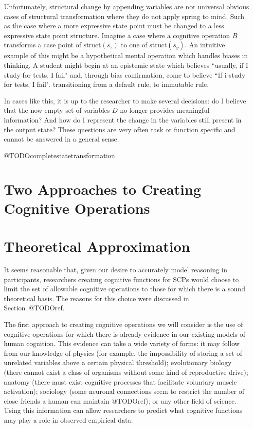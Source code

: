 Unfortunately, structural change by appending variables are not universal obvious cases of structural transformation where they do not apply spring to mind. Such as the case where a more expressive state point must be changed to a less expressive state point structure. Imagine a case where a cognitive operation $B$ transforms a case point of $\textrm{struct}(s_z)$ to one of $\textrm{struct}(s_y)$. An intuitive example of this might be a hypothetical mental operation which handles biases in thinking. A student might begin at an epistemic state which believes ``usually, if I study for tests, I fail" and, through bias confirmation, come to believe ``If i study for tests, I fail", transitioning from a default rule, to immutable rule. 

In cases like this, it is up to the researcher to make several decisions: do I believe that the now empty set of variables $D$ no longer provides meaningful information? And how do I represent the change in the variables still present in the output state? These questions are very often task or function specific and cannot be answered in a general sense.

@TODOcompletestatetransformation

\section{Two Approaches to Creating Cognitive Operations}
\section{Theoretical Approximation}
It seems reasonable that, given our desire to accurately model reasoning in participants, researchers creating cognitive functions for SCPs would choose to limit the set of allowable cognitive operations to those for which there is a sound theoretical basis. The reasons for this choice were discussed in Section~@TODOref.

The first approach to creating cognitive operations we will consider is the use of cognitive operations for which there is already evidence in our existing models of human cognition. This evidence can take a wide variety of forms: it may follow from our knowledge of physics (for example, the impossibility of storing a set of unrelated variables above a certain physical threshold); evolutionary biology (there cannot exist a class of organisms without some kind of reproductive drive); anatomy (there must exist cognitive processes that facilitate voluntary muscle activation); sociology (some neuronal connections seem to restrict the number of close friends a human can maintain @TODOref); or any other field of science. Using this information can allow researchers to predict what cognitive functions may play a role in observed empirical data. 

